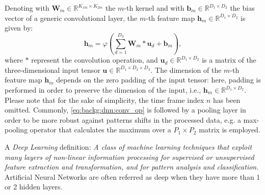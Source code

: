 \begin{enumerate}
	Denoting with $\mathbf{W}_{m} \in \mathbb{R}^{K_{1m}\times K_{2m}}$ the $m$-th kernel and with $\mathbf{b}_{m}  \in \mathbb{R}^{D_1\times D_2}$ the bias vector of a generic convolutional layer, the $m$-th feature map  $\mathbf{h}_{m} \in \mathbb{R}^{D_1\times D_2}$ is given by:
	\begin{equation}\label{eq:backg:dnn:conv_op}
	\mathbf{h}_{m}=\varphi	\left(\sum_{d=1}^{D_3} \mathbf{W}_{m} \ast \mathbf{u}_d + \mathbf{b}_{m} \right),
	\end{equation}
	where $\ast$ represent the convolution operation, and $\mathbf{u}_{d} \in \mathbb{R}^{D_1\times D_2} $ is a matrix of the three-dimensional input tensor $\mathbf{u} \in \mathbb{R}^{D_1\times D_2 \times D_3}$. The dimension of the $m$-th feature map $\mathbf{h}_{m}$ depends on the zero padding of the input tensor: here, padding is performed in order to preserve the dimension of the input, i.e., $\mathbf{h}_{m} \in \mathbb{R}^{D_1\times D_2}$. Please note that for the sake of simplicity, the time frame index $n$ has been omitted.  %
	Commonly, \eqref{eq:backg:dnn:conv_op} is followed by a pooling layer in order to be more robust against patterns shifts in the processed data, e.g. a max-pooling operator that calculates the maximum over a $P_1 \times P_2 $ matrix is employed.
	
\end{enumerate}


A \textit{Deep Learning} definition: \textit{A  class  of  machine learning  techniques  that
	exploit  many  layers  of  non-linear  information  processing  for supervised  or  unsupervised  feature  extraction  and  transformation, and for pattern analysis and classification.}
Artificial Neural Networks are often referred as deep when they have more than 1 or 2 hidden layers.


